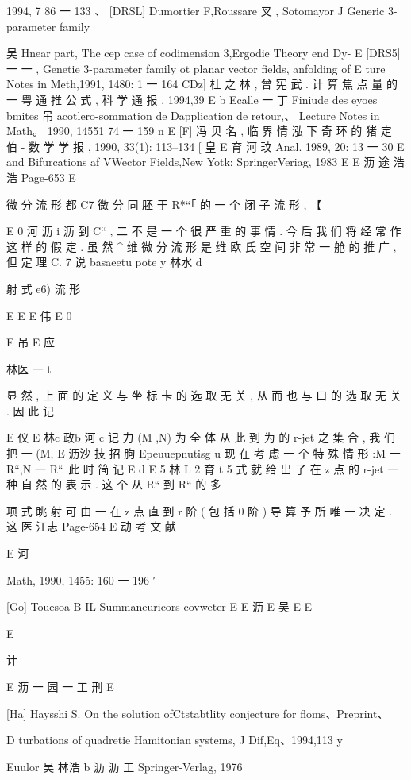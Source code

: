 1994, 7 86 一 133 、
[DRSL] Dumortier F,Roussare 叉 , Sotomayor J Generic 3-parameter family

吴
Hnear part, The cep case of codimension 3,Ergodie Theory end Dy-
E
[DRS5] 一 一 , Genetie 3-parameter family ot planar vector fields, anfolding of
E
ture Notes in Meth,1991, 1480: 1 一 164
CDz] 杜 之 林 , 曾 宪 武 . 计 算 焦 点 量 的 一 粤 通 推 公 式 , 科 学 通 报 , 1994,39
E b
Ecalle 一 丁 Finiude des eyoes bmites 吊 acotlero-sommation de
Dapplication de retour,、 Lecture Notes in Math。 1990, 14551 74 一 159
n
E
[F] 冯 贝 名 , 临 界 情 泓 下 奇 环 的 猪 定 伯 - 数 学 学 报 , 1990, 33(1): 113--134
[ 皇 E 育 河
玟
Anal. 1989, 20: 13 一 30
E
and Bifurcations af VWector Fields,New Yotk: SpringerVeriag, 1983
E
E 沥 途 浩 浩
Page-653
E

微 分 流 形 都 C7 微 分 同 胚 于 R*“「 的 一 个 闭 子 流 形 , 【

E 0 河 沥 i 沥
到 C“ , 二 不 是 一 个 很 严 重 的 事 情 . 今 后 我 们 将 经 常 作 这 样 的 假 定 .
虽 然 ^ 维 微 分 流 形 是 维 欧 氏 空 间 非 常 一 舱 的 推 广 , 但 定 理 C. 7 说
basaeetu pote y 林水 d

射 式 e6) 流 形

E E
E 伟
E 0

E 吊
E 应

林医 一
t

显 然 , 上 面 的 定 义 与 坐 标 卡 的 选 取 无 关 , 从 而 也 与 口 的 选 取 无
关 . 因 此 记

E 仪
E 林c 政b 河 c
记 力 (M ,N) 为 全 体 从 此 到 为 的 r-jet 之 集 合 , 我 们 把 一 (M,
E 沥沙 技 招 朐
Epeuuepnutisg u
现 在 考 虑 一 个 特 殊 情 形 :M 一 R“,N 一 R“. 此 时 简 记
E d
E 5 林 L 2 育 t 5
式 就 给 出 了 在 z 点 的 r-jet 一 种 自 然 的 表 示 . 这 个 从 R“ 到 R“ 的 多

项 式 眺 射 可 由 一 在 z 点 直 到 r 阶 ( 包 括 0 阶 ) 导 算 予 所 唯 一 决 定 . 这
医 江志
Page-654
E 动 考 文 献

E 河

Math, 1990, 1455: 160 一 196 ′

[Go] Touesoa B IL Summaneuricors covweter E
E 沥 E 吴 E
E

E

计

E 沥 一 园 一 工 刑
E

[Ha] Haysshi S. On the solution ofCtstabtlity conjecture for floms、Preprint、

D
turbations of quadretie Hamitonian systems, J Dif,Eq、1994,113
y

Euulor 吴 林浩 b 沥 沥 工
Springer-Verlag, 1976

